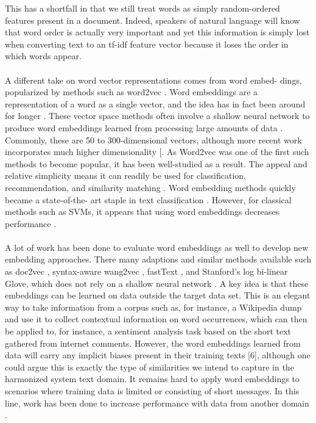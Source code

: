 This has a shortfall in that we still treat words as simply random-ordered features present in a document. Indeed, speakers of natural language will know that word order is actually very important and yet this information is simply lost when converting text to an tf-idf feature vector because it loses the order in which words appear.\\
\\
A different take on word vector representations comes from word embed- dings, popularized by methods such as word2vec \cite{Mikolov2013}. Word embeddings are a representation of a word as a single vector, and the idea has in fact been around for longer \cite{Bengio2003}. These vector space methods often involve a shallow neural network to produce word embeddings learned from processing large amounts of data \cite{Mikolov2013, Levy2014, Goldberg2016}. Commonly, these are 50 to 300-dimensional vectors, although more recent work incorporates much higher dimensionality [\cite{Devlin2018, Peters2018}. As Word2vec was one of the first such methods to become popular, it has been well-studied as a result. The appeal and relative simplicity means it can readily be used for classification, recommendation, and similarity matching \cite{Kenter2015}. Word embedding methods quickly became a state-of-the- art staple in text classification \cite{Peters2018, Howard2018}. However, for classical methods such as SVMs, it appears that using word embeddings decreases performance \cite{Lilleberg2015}.\\
\\
A lot of work has been done to evaluate word embeddings as well to develop new embedding approaches. There many adaptions and similar methods available such as doc2vec \cite{Le2014}, syntax-aware wang2vec \cite{Ling2015}, fastText \cite{Bojanowski2016}, and Stanford’s log bi-linear Glove, which does not rely on a shallow neural network \cite{Pennington2014}.
A key idea is that these embeddings can be learned on data outside the target data set. This is an elegant way to take information from a corpus such as, for instance, a Wikipedia dump and use it to collect contextual information on word occurrences, which can then be applied to, for instance, a sentiment analysis task based on the short text gathered from internet comments. However, the word embeddings learned from data will carry any implicit biases present in their training texts [6], although one could argue this is exactly the type of similarities we intend to capture in the harmonized system text domain. It remains hard to apply word embeddings to scenarios where training data is limited or consisting of short messages. In this line, work has been done to increase performance with data from another domain \cite{Abdelwahab2016}.


